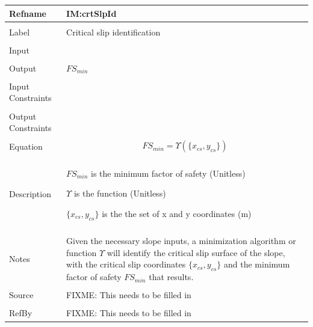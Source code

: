\documentclass[12pt]{article}
\begin{document}
\noindent \begin{minipage}{\textwidth}
\begin{tabular}{p{} p{}}
\toprule \textbf{Refname} & \textbf{IM:crtSlpId}
\label{IM:crtSlpId}
\\ \midrule \\
Label & Critical slip identification
\\ \midrule \\
Input & 
\\ \midrule \\
Output & ${FS_{min}}$
\\ \midrule \\
Input Constraints & 
\\ \midrule \\
Output Constraints & 
\\ \midrule \\
Equation & \begin{dmath}
           {FS_{min}}=Υ\left(\{{x_{cs}}{,y_{cs}}\}\right)
           \end{dmath}
\\ \midrule \\
Description & \begin{symbDescription}
              \item{${FS_{min}}$ is the minimum factor of safety (Unitless)}
              \item{$Υ$ is the function (Unitless)}
              \item{$\{{x_{cs}}{,y_{cs}}\}$ is the the set of x and y coordinates (m)}
              \end{symbDescription}
\\ \midrule \\
Notes & Given the necessary slope inputs, a minimization algorithm or function $Υ$ will identify the critical slip surface of the slope, with the critical slip coordinates $\{{x_{cs}}{,y_{cs}}\}$ and the minimum factor of safety ${FS_{min}}$ that results.
\\ \midrule \\
Source & FIXME: This needs to be filled in
\\ \midrule \\
RefBy & FIXME: This needs to be filled in
\\ \bottomrule \end{tabular}
\end{minipage}\\
\end{document}
